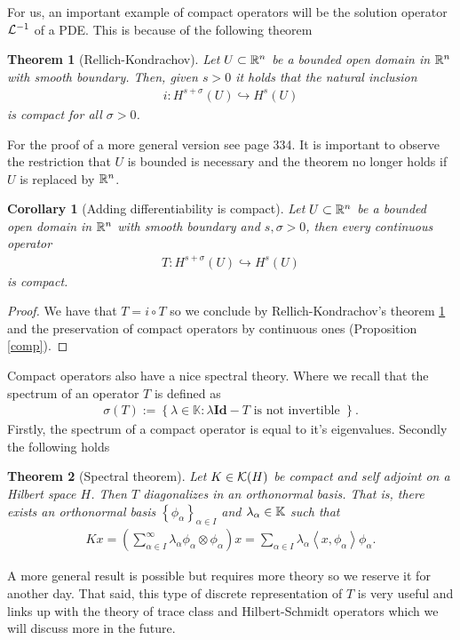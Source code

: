 \documentclass[12pt]{article}
\newtheorem{theorem}{Theorem}
\newtheorem{corollary}{Corollary}
\newcommand{\br}[1]{\left\langle#1\right\rangle} \newcommand{\set}[1]{\left\{#1\right\}}\newcommand{\qt}[1]{\left(#1\right)} \newcommand{\qp}[1]{\left(#1\right)}\newcommand{\qb}[1]{\left[#1\right]}
\renewcommand{\I}{\mathbf{Id}}
\begin{document}
\begin{CJK*}{UTF8}{gbsn}
	For us, an important example of compact operators will be the solution operator $\mathcal{L}^{-1}$ of a PDE. This is because of the following theorem
	\begin{theorem}[Rellich-Kondrachov]\label{Rellich} Let $U \subset \mathbb{R}^n$ be a bounded open domain in $\mathbb{R}^n$ with smooth boundary. Then, given $s >0$ it holds that the natural inclusion
		\begin{align*}
			i: H^{s+ \sigma }(U) \hookrightarrow H^s(U)
		\end{align*}
		is compact for all $\sigma >0$.
	\end{theorem}
	For the proof of a more general version see \cite{taylor2013partial} page 334. It is important to observe the restriction that $U$ is bounded is necessary and the theorem no longer holds if  $U$ is replaced by  $\mathbb{R}^n$.
	\begin{corollary}[Adding differentiability is compact]\label{addd}
		Let $U \subset \mathbb{R}^n$ be a bounded open domain in $\mathbb{R}^n$ with smooth boundary and $s, \sigma >0$, then every continuous operator
		\begin{align*}
			T:H^{s+ \sigma }(U) \hookrightarrow H^s(U)
		\end{align*}
		is compact.
	\end{corollary}
	\begin{proof}
		We have that $T= i \circ T$ so we conclude by Rellich-Kondrachov's theorem \ref{Rellich} and the preservation of compact operators by continuous ones (Proposition \ref{comp}).
	\end{proof}
	Compact operators also have a nice spectral theory. Where we recall that
	the spectrum of an operator $T$ is defined as
	\begin{align*}
		\sigma (T):=\left\{\lambda \in \mathbb{K}: \lambda \I -T \text{ is not invertible } \right\} .
	\end{align*}
	Firstly, the spectrum of a compact operator is equal
	to it's eigenvalues. Secondly the following holds
	\begin{theorem}[Spectral theorem] Let $K \in \mathcal{K}(H)$ be compact and self adjoint on a Hilbert space $H$. Then  $T$ diagonalizes in an orthonormal basis. That is, there exists an orthonormal basis $\set{\phi_\alpha} _{\alpha \in  I}$  and $\lambda _\alpha \in \mathbb{K}$ such that
		\begin{align*}
			Kx=\qp{\sum_{\alpha \in I}^{\infty} \lambda _\alpha \phi_\alpha\otimes \phi_\alpha} x  =\sum_{\alpha \in  I} \lambda _\alpha \br{x,\phi_\alpha}\phi_\alpha .
		\end{align*}
	\end{theorem}
	A more general result is possible but requires more theory so we reserve
	it for another day. That said, this type of discrete representation of
	$T$ is very useful and links up with the theory of trace class and
	Hilbert-Schmidt operators which we will discuss more in the future.


\end{CJK*}
\end{document}
